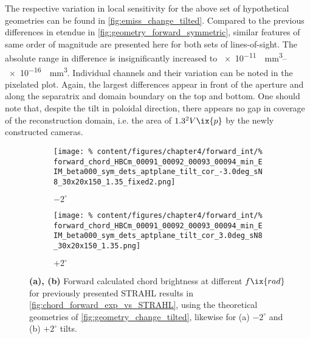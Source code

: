             The respective variation in local sensitivity for the above set of hypothetical geometries can be found in \cref{fig:emiss_change_tilted}. Compared to the previous differences in etendue in \cref{fig:geometry_forward_symmetric}, similar features of same order of magnitude are presented here for both sets of lines-of-sight. The absolute range in difference is insignificantly increased to \SIrange[per-mode=reciprocal]{e-11}{e-16}{\per\cubic\milli\meter}. Individual channels and their variation can be noted in the pixelated plot. Again, the largest differences appear in front of the aperture and along the separatrix and domain boundary on the top and bottom. One should note that, despite the tilt in poloidal direction, there appears no gap in coverage of the reconstruction domain, i.e. the area of $1.3^{2}V\ix{p}$ by the newly constructed cameras.\\%
%
            \begin{figure}[t]%
                \centering%
                \begin{subfigure}{0.47\textwidth}%
                    \texttt{[image: \%
                        content/figures/chapter4/forward\_int/\%
                        forward\_chord\_HBCm\_00091\_00092\_00093\_00094\_min\_EIM\_beta000\_sym\_dets\_aptplane\_tilt\_cor\_-3.0deg\_sN8\_30x20x150\_1.35\_fixed2.png]}%
                    \caption{$-2^{\circ}$}%
                \end{subfigure}%
                \hfill%
                \begin{subfigure}{0.47\textwidth}%
                    \texttt{[image: \%
                        content/figures/chapter4/forward\_int/\%
                        forward\_chord\_HBCm\_00091\_00092\_00093\_00094\_min\_EIM\_beta000\_sym\_dets\_aptplane\_tilt\_cor\_3.0deg\_sN8\_30x20x150\_1.35.png]}%
                    \caption{$+2^{\circ}$}%
                \end{subfigure}%
                \caption{\textbf{(a), (b)} Forward calculated chord brightness at different $f\ix{rad}$ for previously presented STRAHL results in \cref{fig:chord_forward_exp_vs_STRAHL}, using the theoretical geometries of \cref{fig:geometry_change_tilted}, likewise for (a) $-2^{\circ}$ and (b) $+2^{\circ}$ tilts.}\label{fig:chord_change_tilted}%
            \end{figure}%
%
